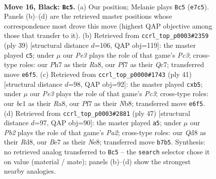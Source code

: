 \documentclass[11pt]{article}
\begin{document}
\clearpage

\begin{figure}[p]\centering
\begin{subfigure}{0.46\textwidth}\centering
\resizebox{\linewidth}{!}{%
\newchessgame
\chessboard[
  setfen={rnbqnrk1/1p2bppp/4p3/p3PP1P/P1PN4/6P1/6B1/RNBQ1RK1 b - - 0 16},
  showmover=false,
  pgfstyle=straightmove, color=movearrow, markmove={e7-c5}
]}
\caption{}
\end{subfigure}\hfill
\begin{subfigure}{0.46\textwidth}\centering
\resizebox{\linewidth}{!}{%
\newchessgame
\chessboard[
  setfen={r2r2k1/1bqn1pbp/2p3p1/p2P4/P2Np2P/2R1P3/3NBPP1/3Q1RK1 b - - 1 20},
  showmover=false,
  pgfstyle=straightmove, color=movearrow, markmove={c6-c5}
]}
\caption{}
\end{subfigure}
\\[4pt]
\begin{subfigure}{0.46\textwidth}\centering
\resizebox{\linewidth}{!}{%
\newchessgame
\chessboard[
  setfen={rn1q1rk1/p4pp1/1pp1b2p/PP1pP3/3P4/6P1/B2N2PP/R2Q1R1K b - - 0 21},
  showmover=false,
  pgfstyle=straightmove, color=movearrow, markmove={c6-b5}
]}
\caption{}
\end{subfigure}\hfill
\begin{subfigure}{0.46\textwidth}\centering
\resizebox{\linewidth}{!}{%
\newchessgame
\chessboard[
  setfen={3rnrk1/p1q1bppp/1p2p3/4PP2/1pNP2P1/1P6/R5BP/3Q1R1K b - - 2 24},
  showmover=false,
  pgfstyle=straightmove, color=movearrow, markmove={a7-a5}
]}
\caption{}
\end{subfigure}
\caption{\textbf{Move 16, Black: \texttt{Bc5}.} (a) Our position; Melanie plays \texttt{Bc5} (\texttt{e7c5}). Panels (b)--(d) are the retrieved master positions whose correspondence most drove this move (highest QAP objective among those that transfer to it). (b) Retrieved from \texttt{ccrl\_top\_p0003\#2359} (ply 39) [structural distance $d$=106, QAP obj=119]: the master played \texttt{c5}; under $\mu$ our \emph{Pe3} plays the role of that game's \emph{Pc3}; cross-type roles: our \emph{P}h7 as their \emph{R}a8, our \emph{P}f7 as their \emph{Q}c7; transferred move \texttt{e6f5}. (c) Retrieved from \texttt{ccrl\_top\_p0000\#1743} (ply 41) [structural distance $d$=98, QAP obj=92]: the master played \texttt{cxb5}; under $\mu$ our \emph{Pe3} plays the role of that game's \emph{Pc3}; cross-type roles: our \emph{b}c1 as their \emph{R}a8, our \emph{P}f7 as their \emph{N}b8; transferred move \texttt{e6f5}. (d) Retrieved from \texttt{ccrl\_top\_p0003\#2881} (ply 47) [structural distance $d$=97, QAP obj=90]: the master played \texttt{a5}; under $\mu$ our \emph{Pb2} plays the role of that game's \emph{Pa2}; cross-type roles: our \emph{Q}d8 as their \emph{R}d8, our \emph{B}e7 as their \emph{N}e8; transferred move \texttt{b7b5}. Synthesis: no retrieved analog transferred to \texttt{Bc5} -- the \texttt{search} selector chose it on value (material / mate); panels (b)--(d) show the strongest nearby analogies.}
\label{fig:thought-m31}
\end{figure}
\end{document}
